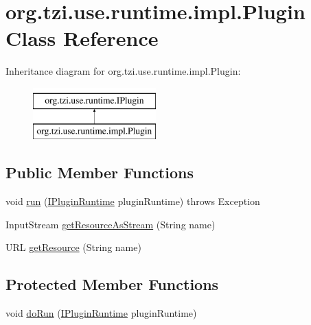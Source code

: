 \hypertarget{classorg_1_1tzi_1_1use_1_1runtime_1_1impl_1_1_plugin}{\section{org.\-tzi.\-use.\-runtime.\-impl.\-Plugin Class Reference}
\label{classorg_1_1tzi_1_1use_1_1runtime_1_1impl_1_1_plugin}
}
Inheritance diagram for org.\-tzi.\-use.\-runtime.\-impl.\-Plugin\-:\begin{figure}[H]
\begin{center}
\leavevmode
\includegraphics[height=2.000000cm]{classorg_1_1tzi_1_1use_1_1runtime_1_1impl_1_1_plugin}
\end{center}
\end{figure}
\subsection*{Public Member Functions}
\begin{DoxyCompactItemize}
\item 
void \hyperlink{classorg_1_1tzi_1_1use_1_1runtime_1_1impl_1_1_plugin_a03fa8f2d7213ac7a7f62ba60adf90d62}{run} (\hyperlink{interfaceorg_1_1tzi_1_1use_1_1runtime_1_1_i_plugin_runtime}{I\-Plugin\-Runtime} plugin\-Runtime)  throws Exception 
\item 
Input\-Stream \hyperlink{classorg_1_1tzi_1_1use_1_1runtime_1_1impl_1_1_plugin_a4dffdf9e525bbe2bfb2f44e62590a2d5}{get\-Resource\-As\-Stream} (String name)
\item 
U\-R\-L \hyperlink{classorg_1_1tzi_1_1use_1_1runtime_1_1impl_1_1_plugin_a5ade5057d5d3a72e28b3363c5cc68a25}{get\-Resource} (String name)
\end{DoxyCompactItemize}
\subsection*{Protected Member Functions}
\begin{DoxyCompactItemize}
\item 
void \hyperlink{classorg_1_1tzi_1_1use_1_1runtime_1_1impl_1_1_plugin_a45ef79e037567dce3e4b9947c1effbf9}{do\-Run} (\hyperlink{interfaceorg_1_1tzi_1_1use_1_1runtime_1_1_i_plugin_runtime}{I\-Plugin\-Runtime} plugin\-Runtime)
\end{DoxyCompactItemize}


